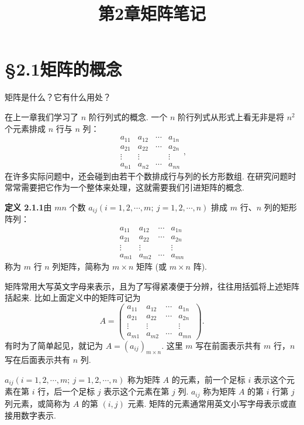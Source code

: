 \documentclass[UTF8,12pt,a4paper,fontset=fandol]{ctexart}
\title{第2章\quad 矩阵笔记}
\author{}
\date{}
\begin{document}
\maketitle

\section*{§2.1\quad 矩阵的概念}

矩阵是什么？它有什么用处？

在上一章我们学习了 $n$ 阶行列式的概念. 一个 $n$ 阶行列式从形式上看无非是将 $n^2$ 个元素排成 $n$ 行与 $n$ 列：
\[
\begin{array}{cccc}
a_{11} & a_{12} & \cdots & a_{1n}\\
a_{21} & a_{22} & \cdots & a_{2n}\\
\vdots & \vdots & & \vdots\\
a_{n1} & a_{n2} & \cdots & a_{nn}
\end{array},
\]
在许多实际问题中，还会碰到由若干个数排成行与列的长方形数组. 在研究问题时常常需要把它作为一个整体来处理，这就需要我们引进矩阵的概念.

\noindent\textbf{定义 2.1.1}\quad 由 $mn$ 个数 $a_{ij}(i=1,2,\cdots,m;\ j=1,2,\cdots,n)$ 排成 $m$ 行、$n$ 列的矩形阵列：
\[
\begin{array}{cccc}
a_{11} & a_{12} & \cdots & a_{1n}\\
a_{21} & a_{22} & \cdots & a_{2n}\\
\vdots & \vdots & & \vdots\\
a_{m1} & a_{m2} & \cdots & a_{mn}
\end{array}
\]
称为 $m$ 行 $n$ 列矩阵，简称为 $m\times n$ 矩阵 (或 $m\times n$ 阵).

矩阵常用大写英文字母来表示，且为了写得紧凑便于分辨，往往用括弧将上述矩阵括起来. 比如上面定义中的矩阵可记为
\[
A=
\left(\begin{array}{cccc}
a_{11} & a_{12} & \cdots & a_{1n}\\
a_{21} & a_{22} & \cdots & a_{2n}\\
\vdots & \vdots & & \vdots\\
a_{m1} & a_{m2} & \cdots & a_{mn}
\end{array}\right).
\]
有时为了简单起见，就记为 $A=(a_{ij})_{m\times n}$. 这里 $m$ 写在前面表示共有 $m$ 行，$n$ 写在后面表示共有 $n$ 列.

$a_{ij}(i=1,2,\cdots,m;\ j=1,2,\cdots,n)$ 称为矩阵 $A$ 的元素，前一个足标 $i$ 表示这个元素在第 $i$ 行，后一个足标 $j$ 表示这个元素在第 $j$ 列. $a_{ij}$ 称为矩阵 $A$ 的第 $i$ 行第 $j$ 列元素，或简称为 $A$ 的第 $(i,j)$ 元素. 矩阵的元素通常用英文小写字母表示或直接用数字表示.
\end{document}
